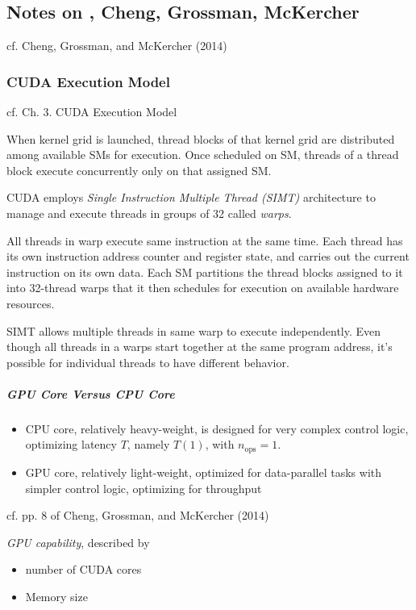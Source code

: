 \documentclass[10pt]{amsart}
\begin{document}
\begin{multicols*}{2}
\part{Notes on , Cheng, Grossman, McKercher}
cf. Cheng, Grossman, and McKercher (2014) \cite{CGM2014}
\section{CUDA Execution Model}
cf. Ch. 3.  CUDA Execution Model 

When kernel grid is launched, thread blocks of that kernel grid are distributed among available SMs for execution.  Once scheduled on SM, threads of a thread block execute concurrently only on that assigned SM.  

CUDA employs \emph{Single Instruction Multiple Thread (SIMT)} architecture to manage and execute threads in groups of 32 called \emph{warps}.  

All threads in warp execute same instruction at the same time.  Each thread has its own instruction address counter and register state, and carries out the current instruction on its own data.  Each SM partitions the thread blocks assigned to it into 32-thread warps that it then schedules for execution on available hardware resources.  

SIMT allows multiple threads in same warp to execute independently.  Even though all threads in a warps start together at the same program address, it's possible for individual threads to have different behavior.  


\subsubsection{GPU Core Versus CPU Core}  

\begin{itemize}
	\item CPU core, relatively heavy-weight, is designed for very complex control logic, optimizing latency $T$, namely $T(1)$, with $n_{\text{ops}}=1$.  
	\item GPU core, relatively light-weight, optimized for data-parallel tasks with simpler control logic, optimizing for throughput   
\end{itemize}
cf. pp. 8 of Cheng, Grossman, and McKercher (2014) \cite{CGM2014}

\emph{GPU capability}, described by 
\begin{itemize}
	\item number of CUDA cores  
	\item Memory size
\end{itemize}


\end{multicols*}
\end{document}
